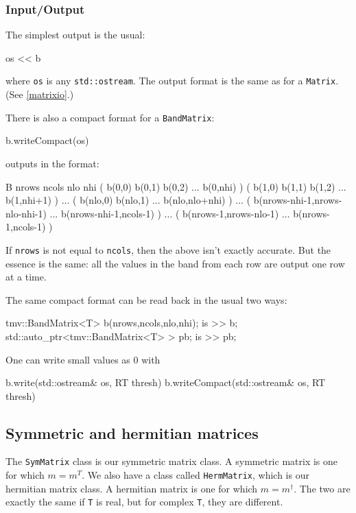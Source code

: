 \documentclass[twoside,letterpaper,11pt]{article}
\renewcommand{\tt}[1]{{\lstinline {#1}}}
\begin{document}
\subsubsection{Input/Output}

The simplest output is the usual:
\begin{tmvcode}
os << b
\end{tmvcode}
where \tt{os} is any \tt{std::ostream}.
The output format is the same as for a \tt{Matrix}.
(See \ref{matrixio}.)

There is also a compact format for a \tt{BandMatrix}:
\begin{tmvcode}
b.writeCompact(os)
\end{tmvcode}
outputs in the format:
\begin{tmvcode}
B nrows ncols nlo nhi
( b(0,0)  b(0,1)  b(0,2) ... b(0,nhi) )
( b(1,0)  b(1,1)  b(1,2) ... b(1,nhi+1) )
...
( b(nlo,0)  b(nlo,1) ...  b(nlo,nlo+nhi) )
...
( b(nrows-nhi-1,nrows-nlo-nhi-1) ... b(nrows-nhi-1,ncols-1) )
...
( b(nrows-1,nrows-nlo-1)  ... b(nrows-1,ncols-1) )
\end{tmvcode}
If \tt{nrows} is not equal to \tt{ncols}, then the above isn't exactly accurate.  But the
essence is the same: all the values in the band from each row are output one row at a time.

The same compact format can be read back in the usual two ways:
\begin{tmvcode}
tmv::BandMatrix<T> b(nrows,ncols,nlo,nhi);
is >> b;
std::auto_ptr<tmv::BandMatrix<T> > pb;
is >> pb;
\end{tmvcode}

One can write small values as 0 with
\begin{tmvcode}
b.write(std::ostream& os, RT thresh)
b.writeCompact(std::ostream& os, RT thresh)
\end{tmvcode}

\subsection{Symmetric and hermitian matrices}

The \tt{SymMatrix} class is our symmetric matrix class.  A symmetric matrix is
one for which $m = m^T$.  We also have a class called
\tt{HermMatrix}, which is our hermitian matrix class.  A hermitian matrix
is one for which $m = m^\dagger$.  The two are exactly the same 
if \tt{T} is real, but for complex \tt{T}, they are different.
\end{document}
